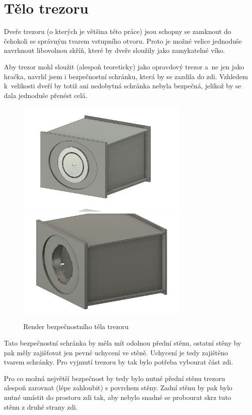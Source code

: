 \section{Tělo trezoru}
Dveře trezoru (o kterých je většina této práce) jsou schopny se zamknout do čehokoli se správným tvarem vstupního otvoru. 
Proto je možné velice jednoduše navrhnout libovolnou skříň, které by dveře sloužily jako zamykatelné víko. 

Aby trezor mohl sloužit (alespoň teoreticky) jako opravdový trezor a~ne jen jako hračka, navrhl jsem i bezpečnostní schránku, která by se zazdila do zdi. 
Vzhledem k~velikosti dveří by totiž ani nedobytná schránka nebyla bezpečná, jelikož by se dala jednoduše přenést celá.

\begin{figure}[htbp]
    \centering
    \includegraphics[width=240pt]{kapitoly/obrazky/E4/bedna/bedna.png}
    \includegraphics[width=240pt]{kapitoly/obrazky/E4/bedna/jen-bedna.png}
    \caption{Render bezpečnostního těla trezoru}
    \label{fig:E4-bedna}
\end{figure}

Tato bezpečnostní schránka by měla mít odolnou přední stěnu, ostatní stěny by pak měly zajišťovat jen pevné uchycení ve stěně.
Uchycení je tedy zajištěno tvarem schránky. Pro vyjmutí trezoru by tak bylo potřeba vybourat část zdi.
\enlargethispage{5mm}

Pro co možná největší bezpečnost by tedy bylo nutné přední stěnu trezoru alespoň zarovnat (lépe zahloubit) s povrchem stěny.
Zadní stěnu by pak bylo nutné umístit do prostoru zdi tak, aby nebylo snadné se probourat skrz tuto stěnu z druhé strany zdi.